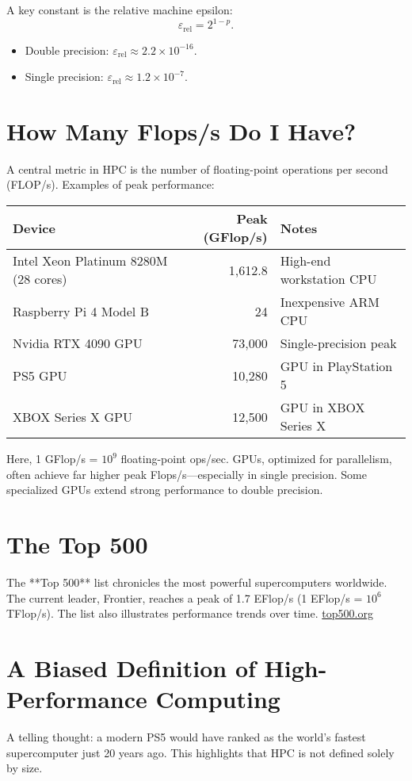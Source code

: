 \documentclass{book}
\begin{document}
A key constant is the relative machine epsilon:
\[
\varepsilon_{\text{rel}} = 2^{1-p}.
\]
\begin{itemize}
  \item Double precision: \(\varepsilon_{\text{rel}} \approx 2.2\times10^{-16}.\)
  \item Single precision: \(\varepsilon_{\text{rel}} \approx 1.2\times10^{-7}.\)
\end{itemize}

\section{How Many Flops/s Do I Have?}
A central metric in HPC is the number of floating-point operations per second (FLOP/s). Examples of peak performance:

\begin{tabular}{l r l}
\textbf{Device} & \textbf{Peak (GFlop/s)} & \textbf{Notes} \\ \hline
Intel Xeon Platinum 8280M (28 cores) & 1,612.8 & High-end workstation CPU \\
Raspberry Pi 4 Model B & 24 & Inexpensive ARM CPU \\
Nvidia RTX 4090 GPU & 73,000 & Single-precision peak \\
PS5 GPU & 10,280 & GPU in PlayStation 5 \\
XBOX Series X GPU & 12,500 & GPU in XBOX Series X \\
\end{tabular}

Here, 1 GFlop/s = \(10^9\) floating-point ops/sec. GPUs, optimized for parallelism, often achieve far higher peak Flops/s—especially in single precision. Some specialized GPUs extend strong performance to double precision.

\section{The Top 500}
The **Top 500** list chronicles the most powerful supercomputers worldwide. The current leader, Frontier, reaches a peak of 1.7 EFlop/s (1 EFlop/s = \(10^6\) TFlop/s). The list also illustrates performance trends over time. \href{https://www.top500.org}{top500.org}

\section{A Biased Definition of High-Performance Computing}
A telling thought: a modern PS5 would have ranked as the world’s fastest supercomputer just 20 years ago. This highlights that HPC is not defined solely by size.
\end{document}
